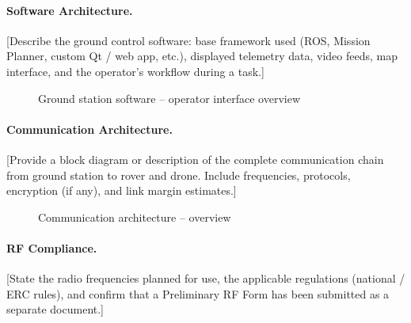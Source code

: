 \paragraph{Software Architecture.}
[Describe the ground control software: base framework used (ROS, Mission
Planner, custom Qt / web app, etc.), displayed telemetry data, video feeds,
map interface, and the operator's workflow during a task.]

\begin{figure}[H]
    \centering
    \caption{Ground station software -- operator interface overview}
    \label{fig:gs_software}
\end{figure}

\paragraph{Communication Architecture.}
[Provide a block diagram or description of the complete communication chain
from ground station to rover and drone. Include frequencies, protocols,
encryption (if any), and link margin estimates.]

\begin{figure}[H]
    \centering
    \caption{Communication architecture -- overview}
    \label{fig:gs_comms}
\end{figure}

\paragraph{RF Compliance.}
[State the radio frequencies planned for use, the applicable regulations
(national / ERC rules), and confirm that a Preliminary RF Form has been
submitted as a separate document.]

